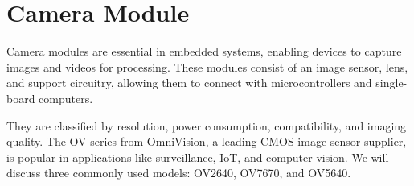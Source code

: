\section{Camera Module}

Camera modules are essential in embedded systems, enabling devices to capture images and videos for processing. These modules consist of an image sensor, lens, and support circuitry, allowing them to connect with microcontrollers and single-board computers. 

They are classified by resolution, power consumption, compatibility, and imaging quality. The OV series from OmniVision, a leading CMOS image sensor supplier, is popular in applications like surveillance, IoT, and computer vision. We will discuss three commonly used models: OV2640, OV7670, and OV5640.

